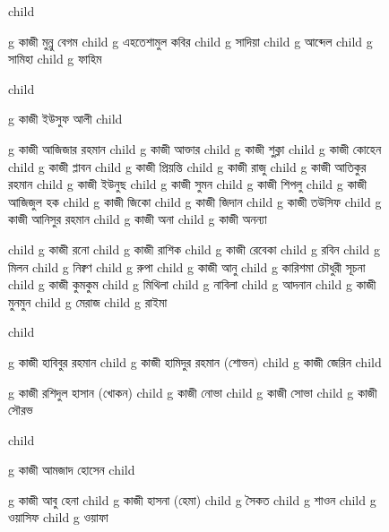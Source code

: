 \documentclass{article}
\begin{document}
\begin{figure}
{\begin{genealogypicture}
{{{{{{            }%
            child{
              g{ কাজী মুন্নু বেগম}
               child{ g{ এহতেশামুল কবির }
                    child{ g{ সাদিয়া }  }
                    child{ g{ আব্দেল}  }
                    child{ g{ সামিহা }  }
                    child{ g{ ফাহিম }  }
               }

            }

          }       
        }
      }
      child{
        g{ কাজী ইউসুফ আলী }
          child{    g{ কাজী আজিজার রহমান } 
              child{    g{ কাজী আক্তার }
                child{    g{ কাজী শুক্লা }   }
                child{    g{ কাজী কোহেন } 
                    child{    g{ কাজী প্লাবন }   }
                    child{    g{ কাজী প্রিয়ন্তি }   }
                  }
                child{    g{ কাজী রাজু }   }  
              }
              child{    g{ কাজী আতিকুর রহমান }   }
              child{    g{ কাজী ইউনুছ } 
                  child{    g{ কাজী সুমন }   }
                  child{    g{ কাজী শিপলু  }   }
              }
              child{    g{ কাজী আজিজুল হক }
                  child{    g{ কাজী জিকো } child{    g{ কাজী জিদান }   }   }
                  child{    g{ কাজী তউসিফ }   }
              }
              child{    g{ কাজী আনিসুর রহমান } 
                  child{    g{ কাজী অনা  }   }
                  child{    g{ কাজী অনন্যা }   }
              }

              child{    g{ কাজী রনো  } child{    g{ কাজী রাশিক  }   }   }
              child{    g{ কাজী রেবেকা } 
                  child{    g{ রবিন }   }
                  child{    g{ মিলন }   }
                  child{    g{ নিক্বণ }   }
                  child{    g{ রুপা }   }
              }
              child{    g{ কাজী আনু  } child{    g{ কারিশমা চৌধুরী সূচনা }   }  }
              child{    g{ কাজী কুমকুম  }
                    child{    g{  মিথিলা }   }
                    child{    g{  নাবিলা }   }
                    child{    g{  আদনান }   }
              }
              child{    g{ কাজী মুনমুন }
                  child{    g{  মেরাজ }   }
                  child{    g{  রাইমা }   }
              }
          }
          child{    g{ কাজী হাবিবুর রহমান }  
              child{    g{ কাজী হামিদুর রহমান (শোভন)  }
                  child{ g{ কাজী জেরিন }  }
              }
              child{    g{ কাজী রশিদুল হাসান (খোকন)  }
              child{ g{ কাজী নোভা }  }
              child{ g{ কাজী সোভা }  }
              child{ g{ কাজী সৌরভ }  }

              }
          }
          child{    g{ কাজী আমজাদ হোসেন } 
          child{    g{ কাজী আবু হেনা }
          child{ g{ কাজী হাসনা (হেমা) } 
              child{ g{ সৈকত  }  }
              child{ g{ শাওন  }  }
              child{ g{ ওয়াসিফ  }  }
              child{ g{ ওয়াফা }  }
          }

}}}}}
\end{genealogypicture}}
\end{figure}
\end{document}

